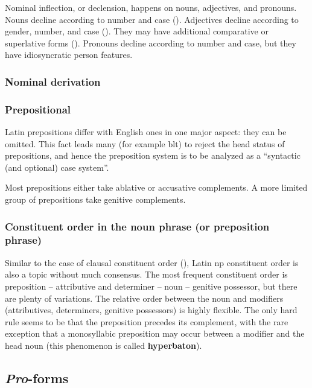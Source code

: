 \documentclass{article}
\newcommand*{\concept}[1]{\textbf{#1}}
\newcommand*{\term}[1]{\emph{#1}}
\begin{document}
Nominal inflection, or declension, happens on nouns, adjectives, and pronouns.
Nouns decline according to number and case ().
Adjectives decline according to gender, number, and case ().
They may have additional comparative or superlative forms ().
Pronouns decline according to number and case,
but they have idiosyncratic person features.

\subsubsection{Nominal derivation}


\subsubsection{Prepositional}\label{sec:prep-abs}

Latin prepositions differ with English ones in one major aspect:
they can be omitted.
This fact leads many (for example \ac{blt}) to reject the head status of prepositions,
and hence the preposition system is to be analyzed as a ``syntactic (and optional) case system''. 

Most prepositions either take ablative or accusative complements.
A more limited group of prepositions take genitive complements.

\subsubsection{Constituent order in the noun phrase (or preposition phrase)}

Similar to the case of clausal constituent order (), 
Latin \ac{np} constituent order is also a topic without much consensus.
The most frequent constituent order is preposition -- attributive and determiner -- noun -- genitive possessor,
but there are plenty of variations.
The relative order between the noun and modifiers (attributives, determiners, genitive possessors)
is highly flexible.
The only hard rule seems to be that the preposition precedes its complement,
with the rare exception that a monosyllabic preposition may occur between a modifier and the head noun
(this phenomenon is called \concept{hyperbaton}).

\subsection{\term{Pro}-forms}\label{sec:pro-abs}
\end{document}
